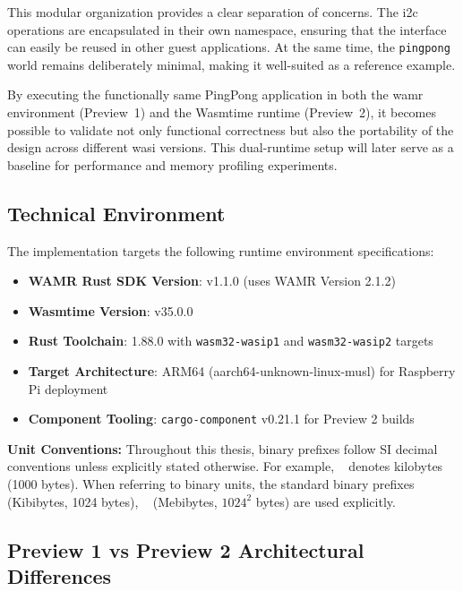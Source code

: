 This modular organization provides a clear separation of concerns. The \acrshort{i2c} operations are encapsulated in their own namespace, ensuring that the interface can easily be reused in other guest applications. At the same time, the \texttt{pingpong} world remains deliberately minimal, making it well-suited as a reference example.  

By executing the functionally same PingPong application in both the \acrshort{wamr} environment (Preview~1) and the Wasmtime runtime (Preview~2), it becomes possible to validate not only functional correctness but also the portability of the design across different \acrshort{wasi} versions. This dual-runtime setup will later serve as a baseline for performance and memory profiling experiments.

\subsection{Technical Environment}

The implementation targets the following runtime environment specifications:

\begin{itemize}
    \item \textbf{WAMR Rust SDK Version}: v1.1.0 (uses WAMR Version 2.1.2)
    \item \textbf{Wasmtime Version}: v35.0.0
    \item \textbf{Rust Toolchain}: 1.88.0 with \texttt{wasm32-wasip1} and \texttt{wasm32-wasip2} targets
    \item \textbf{Target Architecture}: ARM64 (aarch64-unknown-linux-musl) for Raspberry Pi deployment
    \item \textbf{Component Tooling}: \texttt{cargo-component} v0.21.1 for Preview 2 builds
\end{itemize}

\textbf{Unit Conventions:} Throughout this thesis, binary prefixes follow SI decimal conventions unless explicitly stated otherwise. For example, \si{\kilo\byte} denotes kilobytes (1000 bytes). When referring to binary units, the standard binary prefixes \si{\kibi\byte} (Kibibytes, 1024 bytes), \si{\mebi\byte} (Mebibytes, $1024^2$ bytes) are used explicitly.

\subsection{Preview 1 vs Preview 2 Architectural Differences}

